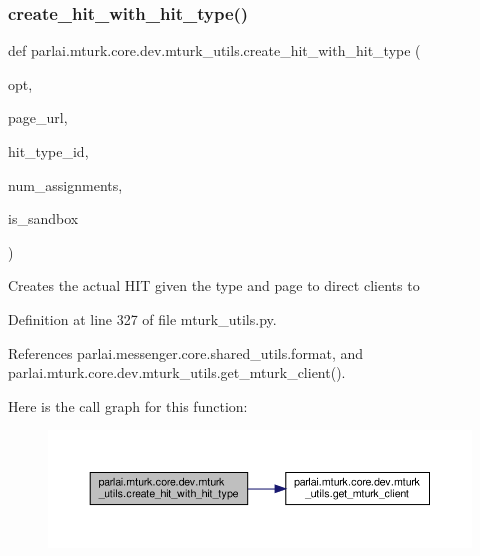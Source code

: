\subsubsection{\texorpdfstring{create\+\_\+hit\+\_\+with\+\_\+hit\+\_\+type()}{create\_hit\_with\_hit\_type()}}
{\footnotesize\ttfamily def parlai.\+mturk.\+core.\+dev.\+mturk\+\_\+utils.\+create\+\_\+hit\+\_\+with\+\_\+hit\+\_\+type (\begin{DoxyParamCaption}\item[{}]{opt,  }\item[{}]{page\+\_\+url,  }\item[{}]{hit\+\_\+type\+\_\+id,  }\item[{}]{num\+\_\+assignments,  }\item[{}]{is\+\_\+sandbox }\end{DoxyParamCaption})}

\begin{DoxyVerb}Creates the actual HIT given the type and page to direct clients to\end{DoxyVerb}
 

Definition at line 327 of file mturk\+\_\+utils.\+py.



References parlai.\+messenger.\+core.\+shared\+\_\+utils.\+format, and parlai.\+mturk.\+core.\+dev.\+mturk\+\_\+utils.\+get\+\_\+mturk\+\_\+client().

Here is the call graph for this function\+:
\nopagebreak
\begin{figure}[H]
\begin{center}
\leavevmode
\includegraphics[width=350pt]{namespaceparlai_1_1mturk_1_1core_1_1dev_1_1mturk__utils_a471ced1f7df897dcf3414dd49b84ddeb_cgraph}
\end{center}
\end{figure}
\mbox{\label{namespaceparlai_1_1mturk_1_1core_1_1dev_1_1mturk__utils_a1a4243aaafd94de8087e0d6ae06ad45c}} 
